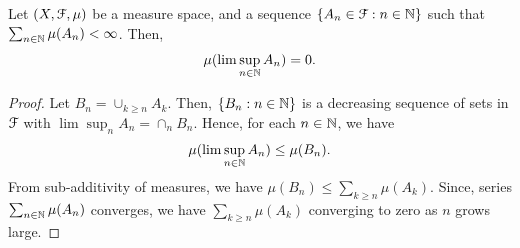 \documentclass[a4paper,english,12pt]{article}
\begin{document}
\begin{prop} Let $(X, \mathcal{F}, \mu)$ be a measure space, and a sequence $\{A_n \in \mathcal{F}: n \in \mathbb{N}\}$ such that $\sum_{n \in \mathbb{N}}\mu(A_n) < \infty$. Then, 
\begin{align*}
\mu(\lim\sup_{n \in \mathbb{N}} A_n) = 0.
\end{align*}
\end{prop}
\begin{proof} Let $B_n = \cup_{k \geq n}A_k$. Then, $\{B_n: n \in \mathbb{N}\}$ is a decreasing sequence of sets in $\mathcal{F}$ with $\lim\sup_{n} A_n = \cap_{n}B_n$. Hence, for each $n \in \mathbb{N}$, we have
\begin{align*}
\mu(\lim\sup_{n \in \mathbb{N}} A_n) \leq \mu(B_n).
\end{align*}
From sub-additivity of measures, we have $\mu(B_n) \leq \sum_{k \geq n}\mu(A_k)$. Since, series $\sum_{n \in \mathbb{N}}\mu(A_n)$ converges, we have $\sum_{k \geq n}\mu(A_k)$ converging to zero as $n$ grows large.
\end{proof}
\end{document}
